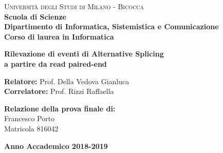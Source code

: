 \begin{titlepage}

        \noindent
        \begin{minipage}[t]{0.19\textwidth}
        \end{minipage}
        \begin{minipage}[t]{0.81\textwidth}
        {
                {\textsc{Università degli Studi di Milano - Bicocca}} \\
                \textbf{Scuola di Scienze} \\
                \textbf{Dipartimento di Informatica, Sistemistica e Comunicazione} \\
                \textbf{Corso di laurea in Informatica} \\
                \par
        }
        \end{minipage}

	\vspace{40mm}

	\begin{center}
            {\LARGE{
                    \textbf{Rilevazione di eventi di Alternative Splicing \\ a partire da read paired-end}
                    \par
            }}
        \end{center}

        \vspace{50mm}

        \noindent
        {\large \textbf{Relatore:} Prof. Della Vedova Gianluca } \\

        \noindent
        {\large \textbf{Correlatore:} Prof. Rizzi Raffaella}

        \vspace{15mm}

        \begin{flushright}
            {\large \textbf{Relazione della prova finale di:}} \\
            \large{Francesco Porto} \\
            \large{Matricola 816042}
        \end{flushright}

        \vspace{40mm}
        \begin{center}
            {\large{\bf Anno Accademico 2018-2019}}
        \end{center}

        \restoregeometry

    \end{titlepage}